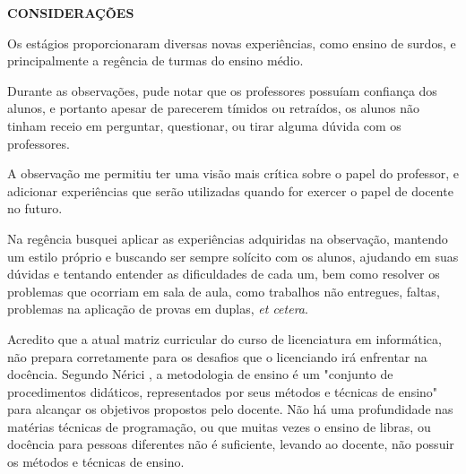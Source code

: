 \begin{OnehalfSpace}
    \noindent\textbf{CONSIDERAÇÕES}

    Os estágios proporcionaram diversas novas experiências, como ensino de surdos, e principalmente a regência de turmas do ensino médio.

    Durante as observações, pude notar que os professores possuíam confiança dos alunos, e portanto apesar de parecerem tímidos ou retraídos, os alunos não tinham receio em perguntar, questionar, ou tirar alguma dúvida com os professores.

    A observação me permitiu ter uma visão mais crítica sobre o papel do professor, e adicionar experiências que serão utilizadas quando for exercer o papel de docente no futuro.

    Na regência busquei aplicar as experiências adquiridas na observação, mantendo um estilo próprio e buscando ser sempre solícito com os alunos, ajudando em suas dúvidas e tentando entender as dificuldades de cada um, bem como resolver os problemas que ocorriam em sala de aula, como trabalhos não entregues, faltas, problemas na aplicação de provas em duplas, \textit{et cetera}.

    Acredito que a atual matriz curricular do curso de licenciatura em informática, não prepara corretamente para os desafios que o licenciando irá enfrentar na docência. Segundo Nérici \cite{nerici1987}, a metodologia de ensino é um "conjunto de procedimentos didáticos, representados por seus métodos e técnicas de ensino" para alcançar os objetivos propostos pelo docente. Não há uma profundidade nas matérias técnicas de programação, ou que muitas vezes o ensino de libras, ou docência para pessoas diferentes não é suficiente, levando ao docente, não possuir os métodos e técnicas de ensino.

\end{OnehalfSpace}